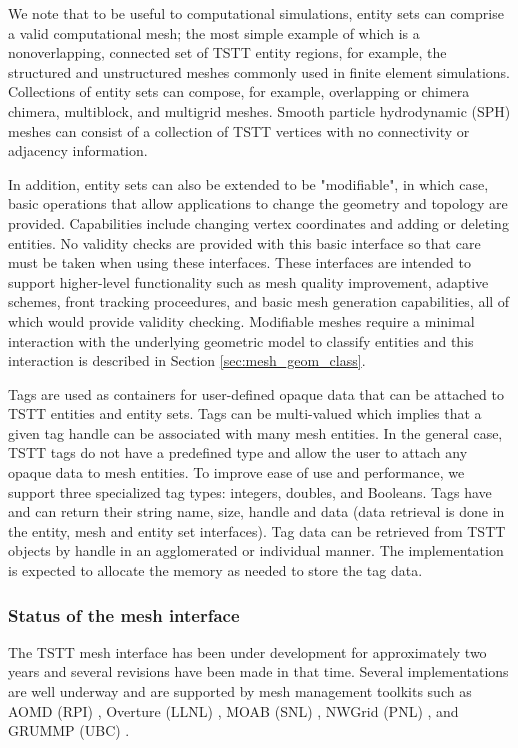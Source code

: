 We note that to be useful to computational simulations, entity sets
can comprise a valid computational mesh; the most simple example of
which is a nonoverlapping, connected set of TSTT entity regions, for
example, the structured and unstructured meshes commonly used in
finite element simulations.  Collections of entity sets can compose,
for example, overlapping or chimera chimera, multiblock, and multigrid
meshes. Smooth particle hydrodynamic (SPH) meshes can consist
of a collection of TSTT vertices with no connectivity or adjacency
information.

In addition, entity sets can also be extended to be "modifiable", in
which case, basic operations that allow applications to change the
geometry and topology are provided.  Capabilities include changing
vertex coordinates and adding or deleting entities. No validity checks
are provided with this basic interface so that care must be taken when
using these interfaces.  These interfaces are intended to support
higher-level functionality such as mesh quality improvement, adaptive
schemes, front tracking proceedures, and basic mesh generation
capabilities, all of which would provide validity checking.
Modifiable meshes require a minimal interaction with the underlying
geometric model to classify entities and this interaction is described
in Section \ref{sec:mesh_geom_class}.

Tags are used as containers for user-defined opaque data that can be
attached to TSTT entities and entity sets.  Tags can be
multi-valued which implies that a given tag handle can be associated
with many mesh entities.  In the general case, TSTT tags do not have a
predefined type and allow the user to attach any opaque data to mesh
entities.  To improve ease of use and performance, we support three
specialized tag types: integers, doubles, and Booleans.  Tags have and
can return their string name, size, handle and data (data retrieval is
done in the entity, mesh and entity set interfaces).  Tag data can be
retrieved from TSTT objects by handle in an agglomerated or individual
manner.  The implementation is expected to allocate the memory as
needed to store the tag data.

\subsubsection{Status of the mesh interface}

The TSTT mesh interface has been under development for approximately
two years and several revisions have been made in that time.  Several
implementations are well underway and are supported by mesh management
toolkits such as AOMD (RPI) \cite{aomd}, Overture (LLNL)
\cite{overture}, MOAB (SNL) \cite{moab}, NWGrid (PNL) \cite{nwgrid},
and GRUMMP (UBC) \cite{grummp}.  

